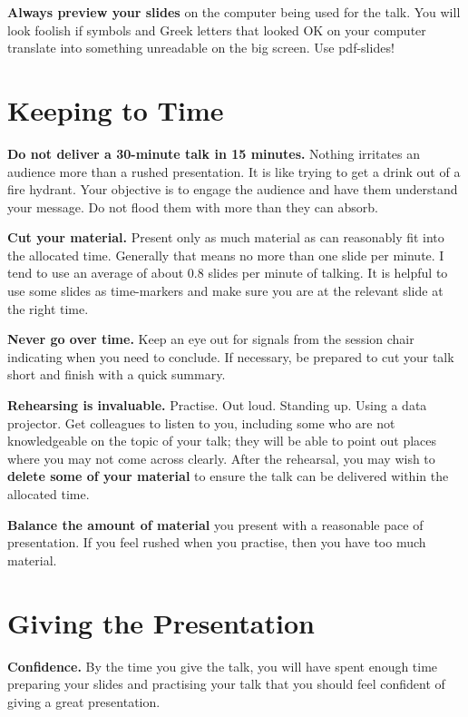 \documentclass[
]{book}
\begin{document}
\textbf{Always preview your slides} on the computer being
used for the talk. You will look foolish if symbols
and Greek letters that looked OK on your computer
translate into something unreadable on the big
screen. Use pdf-slides!

\hypertarget{keeping-to-time}{%
\section{Keeping to Time}\label{keeping-to-time}}

\textbf{Do not deliver a 30-minute talk in 15 minutes.} Nothing
irritates an audience more than a rushed presentation.
It is like trying to get a drink out of a fire hydrant.
Your objective is to engage the audience and
have them understand your message. Do not flood
them with more than they can absorb.

\textbf{Cut your material.} Present only as much material as can reasonably
fit into the allocated time. Generally that means no
more than one slide per minute. I tend to use an average
of about 0.8 slides per minute of talking. It is
helpful to use some slides as time-markers and make
sure you are at the relevant slide at the right time.

\textbf{Never go over time.} Keep an eye out for signals
from the session chair indicating when you need to
conclude. If necessary, be prepared to cut your talk
short and finish with a quick summary.

\textbf{Rehearsing is invaluable.} Practise. Out loud.
Standing up. Using a data projector. Get colleagues
to listen to you, including some who are not knowledgeable
on the topic of your talk; they will be able
to point out places where you may not come across
clearly. After the rehearsal, you may wish to
\textbf{delete some of your material} to ensure the talk can be delivered
within the allocated time.

\textbf{Balance the amount of material} you present with
a reasonable pace of presentation. If you feel rushed
when you practise, then you have too much material.

\hypertarget{giving-the-presentation}{%
\section{Giving the Presentation}\label{giving-the-presentation}}

\textbf{Confidence.} By the time you give the talk, you will have spent
enough time preparing your slides and practising
your talk that you should feel confident of giving a
great presentation.
\end{document}
